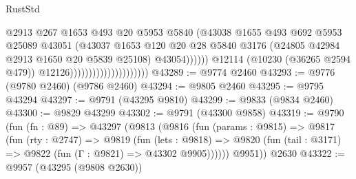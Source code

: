 \begin{lexlean}{RustStd}
\begin{coremodule}
                                                      @2913
                                                      @267
                                                      @1653
                                                      @493
                                                      @20
                                                      @5953
                                                      @5840
                                                      (@43038
                                                        @1655
                                                        @493
                                                        @692
                                                        @5953
                                                        @25089
                                                        @43051
                                                        (@43037
                                                          @1653
                                                          @120
                                                          @20
                                                          @28
                                                          @5840
                                                          @3176
                                                          (@24805
                                                            @42984
                                                            @2913
                                                            @1650
                                                            @20
                                                            @5839
                                                            @25108)
                                                          @43054))))))
                                              @12114
                                              (@10230 (@36265 @2594 @479))
                                              @12126)))))))))))))))))))))
@43289 := @9774 @2460
@43293 := @9776 (@9780 @2460) (@9786 @2460)
@43294 := @9805 @2460
@43295 := @9795 @43294
@43297 := @9791 (@43295 @9810)
@43299 := @9833 (@9834 @2460)
@43300 := @9829 @43299
@43302 := @9791 (@43300 @9858)
@43319 := @9790
    (fun (fn : @89) =>
    @43297
      (@9813
        (@9816
          (fun (params : @9815) =>
          @9817
            (fun (rty : @2747) =>
            @9819
              (fun (lets : @9818) =>
              @9820 (fun (tail : @3171) => @9822 (fun (Γ : @9821) => @43302 @9905))))))
        @9951))
    @2630
@43322 := @9957 (@43295 (@9808 @2630))

\end{coremodule}
\end{lexlean}
